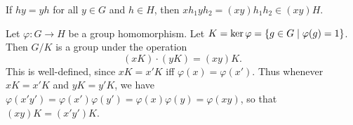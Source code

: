If $hy = yh$ for all $y \in G$ and $h \in H$, then
$xh_1yh_2 = (xy)h_1h_2 \in (xy)H$.

\begin{example}
    Let $\varphi\colon G \to H$ be a group homomorphism.
    Let $K = \ker \varphi = \{g \in G \mid \varphi(g) = 1\}$.
    Then $G/K$ is a group under the operation \[
        (xK) \cdot (yK) = (xy)K.
    \] This is well-defined, since $xK = x'K$ iff
    $\varphi(x) = \varphi(x')$.
    Thus whenever $xK = x'K$ and $yK = y'K$, we have
    $\varphi(x'y') = \varphi(x')\varphi(y') = \varphi(x)\varphi(y) = \varphi(xy)$,
    so that $(xy)K = (x'y')K$.
\end{example}
